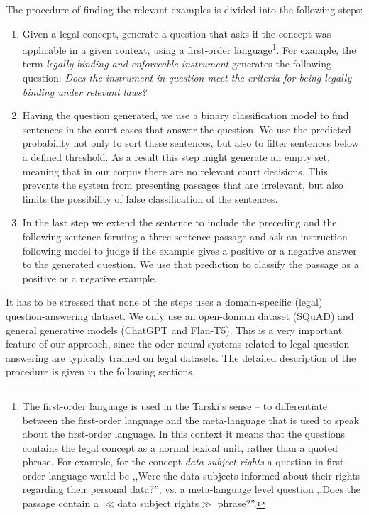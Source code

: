 The procedure of finding the relevant examples is divided into the following steps:
\begin{enumerate}
  \item Given a legal concept, generate a question that asks if the concept was applicable in a given context,
    using a first-order language\footnote{The first-order language is used in the Tarski's sense -- to differentiate
    between the first-order language and the meta-language that is used to speak about the first-order language. In this 
    context it means that the questions contains the legal concept as a normal lexical unit, rather than a quoted phrase.
    For example, for the concept \textit{data subject rights} a question in first-order language would be 
      ,,Were the data subjects informed about their rights regarding their personal data?'', vs. 
      a meta-language level question ,,Does the passage contain a $\ll$data subject rights$\gg$ phrase?''.}.
    For example, the term \textit{legally binding and enforceable instrument} generates the following question:
    \textit{Does the instrument in question meet the criteria for being legally binding under relevant laws?}
  \item Having the question generated, we use a binary classification model to find sentences in the court cases that answer the question. 
    We use the predicted probability not only to sort these sentences, but also to filter sentences below a defined threshold.
    As a result this step might generate an empty set, meaning that in our corpus there are no relevant court decisions. 
    This prevents the system from presenting passages that are irrelevant, but also limits the possibility of false
    classification of the sentences.
  \item In the last step we extend the sentence to include the preceding and the following sentence forming a three-sentence passage
    and ask an instruction-following model to judge if the example gives a positive or a negative answer to the generated question.
    We use that prediction to classify the passage as a positive or a negative example.
\end{enumerate}

It has to be stressed that none of the steps uses a domain-specific (legal) question-answering dataset. We only use an open-domain
dataset (SQuAD) and general generative models (ChatGPT and Flan-T5). This is a very important feature of our approach,
since the oder neural systems related to legal question answering are typically trained on legal datasets.
The detailed description of the procedure is given in the following sections.

